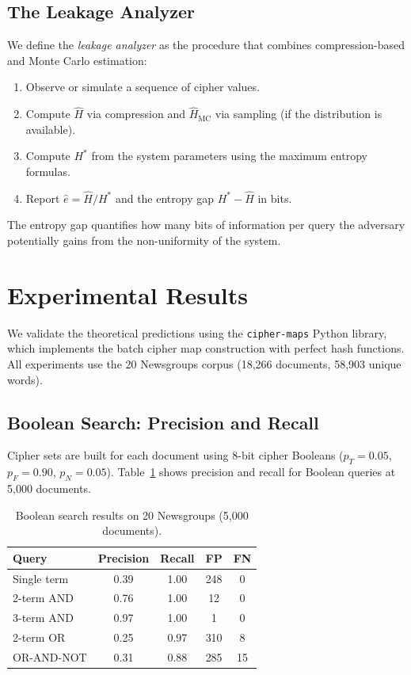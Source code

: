 \documentclass[11pt]{article}
\theoremstyle{definition}
\theoremstyle{plain}
\theoremstyle{remark}
\begin{document}
\subsection{The Leakage Analyzer}

We define the \emph{leakage analyzer} as the procedure that combines
compression-based and Monte Carlo estimation:
\begin{enumerate}
\item Observe or simulate a sequence of cipher values.
\item Compute $\hat{H}$ via compression and $\hat{H}_{\mathrm{MC}}$ via
  sampling (if the distribution is available).
\item Compute $H^*$ from the system parameters using the maximum entropy
  formulas.
\item Report $\hat{e} = \hat{H} / H^*$ and the entropy gap
  $H^* - \hat{H}$ in bits.
\end{enumerate}
The entropy gap quantifies how many bits of information per query the
adversary potentially gains from the non-uniformity of the system.


\section{Experimental Results}
\label{sec:experiments}

We validate the theoretical predictions using the \texttt{cipher-maps}
Python library, which implements the batch cipher map construction with
perfect hash functions.  All experiments use the 20 Newsgroups corpus
(18,266 documents, 58,903 unique words).

\subsection{Boolean Search: Precision and Recall}

Cipher sets are built for each document using 8-bit cipher Booleans
($p_T = 0.05$, $p_F = 0.90$, $p_N = 0.05$).  Table~\ref{tab:boolean}
shows precision and recall for Boolean queries at 5,000 documents.

\begin{table}[ht]
\centering
\caption{Boolean search results on 20 Newsgroups (5,000 documents).}
\label{tab:boolean}
\begin{tabular}{@{}lcccc@{}}
\toprule
Query & Precision & Recall & FP & FN \\
\midrule
Single term & 0.39 & 1.00 & 248 & 0 \\
2-term AND & 0.76 & 1.00 & 12 & 0 \\
3-term AND & 0.97 & 1.00 & 1 & 0 \\
2-term OR & 0.25 & 0.97 & 310 & 8 \\
OR-AND-NOT & 0.31 & 0.88 & 285 & 15 \\
\bottomrule
\end{tabular}
\end{table}
\end{document}
